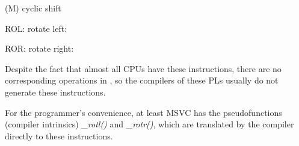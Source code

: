 \label{ROL_ROR}
\item[ROL/ROR] (M) cyclic shift
  
ROL: rotate left:



ROR: rotate right:



Despite the 
fact that almost all \ac{CPU}s have these instructions, there are no corresponding
operations in \CCpp, so the compilers of these \ac{PL}s usually do not generate these 
instructions.

For the programmer's convenience, at least \ac{MSVC} has the pseudofunctions (compiler intrinsics)
\emph{\_rotl()} and \emph{\_rotr()}\FNMSDNROTxURL{},
which are translated by the compiler directly to these instructions.

